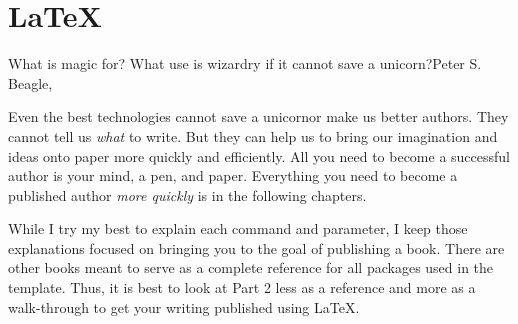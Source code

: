 


\part{LaTeX}
\label{latex:prt}

\begin{myquotation}What is magic for? What use is wizardry if it cannot save a unicorn?\mbox{}\hfill\emdash{}Peter S. Beagle, \ifxetex\label{beagle-heroes-quote}\else~\citep[cf. p.~187f]{lastunicorn2}\fi\end{myquotation}

Even the best technologies cannot save a unicorn\emdash{}or make us better authors. They cannot tell us \textit{what} to write. But they can help us to bring our imagination and ideas onto paper more quickly and efficiently. All you need to become a successful author is your mind, a pen, and paper. Everything you need to become a published author \textit{more quickly} is in the following chapters.

While I try my best to explain each command and parameter, I keep those explanations focused on bringing you to the goal of publishing a book. There are other books meant to serve as a complete reference for all packages used in the template. Thus, it is best to look at Part 2 less as a reference and more as a walk-through to get your writing published using LaTeX.

